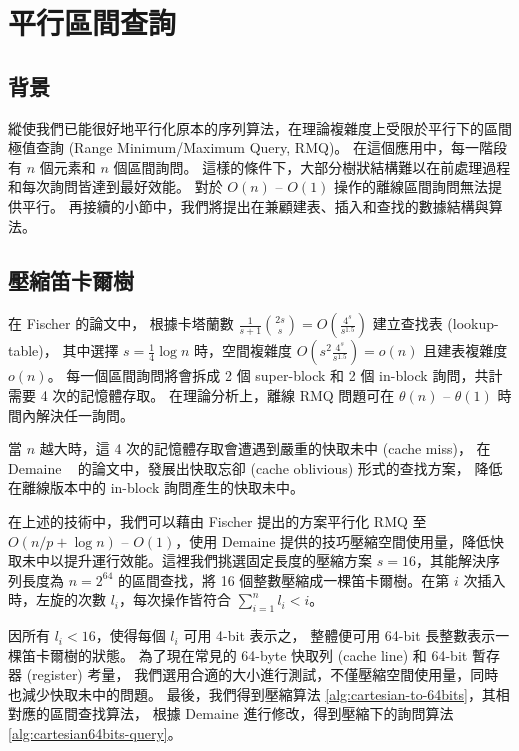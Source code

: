 \section{平行區間查詢}
\label{sec:parallelRMQ}

\subsection{背景}

縱使我們已能很好地平行化原本的序列算法，在理論複雜度上受限於平行下的區間極值查詢 (Range Minimum/Maximum Query, RMQ)。
在這個應用中，每一階段有 $n$ 個元素和 $n$ 個區間詢問。
這樣的條件下，大部分樹狀結構難以在前處理過程和每次詢問皆達到最好效能。
對於 $O(n)$ -- $O(1)$ 操作的離線區間詢問無法提供平行。
再接續的小節中，我們將提出在兼顧建表、插入和查找的數據結構與算法。

\subsection{壓縮笛卡爾樹}

在 Fischer \cite{fischer} 的論文中，
根據卡塔蘭數 $\frac{1}{s+1}\binom{2s}{s} = O(\frac{4^s}{s^{1.5}})$ 建立查找表 (lookup-table)，
其中選擇 $s = \frac{1}{4} \log n$ 時，空間複雜度 $O(s^2 \frac{4^s}{s^{1.5}}) = o(n)$ 且建表複雜度 $o(n)$。
每一個區間詢問將會拆成 2 個 super-block 和 2 個 in-block 詢問，共計需要 4 次的記憶體存取。
在理論分析上，離線 RMQ 問題可在 $\theta(n)$ -- $\theta(1)$ 時間內解決任一詢問。

當 $n$ 越大時，這 4 次的記憶體存取會遭遇到嚴重的快取未中 (cache miss)，
在 Demaine ~\cite{demaine} 的論文中，發展出快取忘卻 (cache oblivious) 形式的查找方案，
降低在離線版本中的 in-block 詢問產生的快取未中。

在上述的技術中，我們可以藉由 Fischer 提出的方案平行化 RMQ 至 $O(n / p + \log n)$ -- $O(1)$，使用 Demaine 提供的技巧壓縮空間使用量，降低快取未中以提升運行效能。這裡我們挑選固定長度的壓縮方案 $s = 16$，其能解決序列長度為 $n = 2^{64}$ 的區間查找，將 16 個整數壓縮成一棵笛卡爾樹。在第 $i$ 次插入時，左旋的次數 $l_i$，每次操作皆符合 $\sum_{i=1}^{n} l_i < i$。

因所有 $l_i < 16$，使得每個 $l_i$ 可用 4-bit 表示之，
整體便可用 64-bit 長整數表示一棵笛卡爾樹的狀態。
為了現在常見的 64-byte 快取列 (cache line) 和 64-bit 暫存器 (register) 考量，
我們選用合適的大小進行測試，不僅壓縮空間使用量，同時也減少快取未中的問題。
最後，我們得到壓縮算法 \ref{alg:cartesian-to-64bits}，其相對應的區間查找算法，
根據 Demaine \cite{demaine} 進行修改，得到壓縮下的詢問算法 \ref{alg:cartesian64bits-query}。

